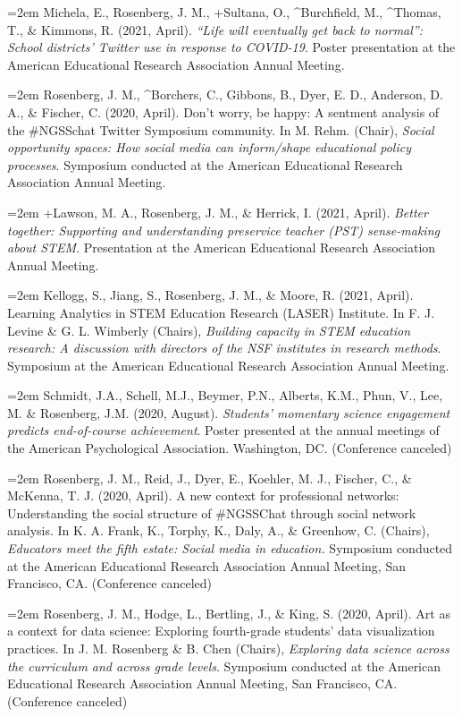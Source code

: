 \documentclass[
  14,
]{article}
\begin{document}
\hangindent=2em Michela, E., Rosenberg, J. M., +Sultana, O.,
\^{}Burchfield, M., \^{}Thomas, T., \& Kimmons, R. (2021, April).
\emph{``Life will eventually get back to normal'': School districts'
Twitter use in response to COVID-19}. Poster presentation at the
American Educational Research Association Annual Meeting.

\hangindent=2em Rosenberg, J. M., \^{}Borchers, C., Gibbons, B., Dyer,
E. D., Anderson, D. A., \& Fischer, C. (2020, April). Don't worry, be
happy: A sentment analysis of the \#NGSSchat Twitter Symposium
community. In M. Rehm. (Chair), \emph{Social opportunity spaces: How
social media can inform/shape educational policy processes}. Symposium
conducted at the American Educational Research Association Annual
Meeting.

\hangindent=2em +Lawson, M. A., Rosenberg, J. M., \& Herrick, I. (2021,
April). \emph{Better together: Supporting and understanding preservice
teacher (PST) sense-making about STEM}. Presentation at the American
Educational Research Association Annual Meeting.

\hangindent=2em Kellogg, S., Jiang, S., Rosenberg, J. M., \& Moore, R.
(2021, April). Learning Analytics in STEM Education Research (LASER)
Institute. In F. J. Levine \& G. L. Wimberly (Chairs), \emph{Building
capacity in STEM education research: A discussion with directors of the
NSF institutes in research methods}. Symposium at the American
Educational Research Association Annual Meeting.

\hangindent=2em Schmidt, J.A., Schell, M.J., Beymer, P.N., Alberts,
K.M., Phun, V., Lee, M. \& Rosenberg, J.M. (2020, August).
\emph{Students' momentary science engagement predicts end-of-course
achievement}. Poster presented at the annual meetings of the American
Psychological Association. Washington, DC. (Conference canceled)

\hangindent=2em Rosenberg, J. M., Reid, J., Dyer, E., Koehler, M. J.,
Fischer, C., \& McKenna, T. J. (2020, April). A new context for
professional networks: Understanding the social structure of \#NGSSChat
through social network analysis. In K. A. Frank, K., Torphy, K., Daly,
A., \& Greenhow, C. (Chairs), \emph{Educators meet the fifth estate:
Social media in education.} Symposium conducted at the American
Educational Research Association Annual Meeting, San Francisco, CA.
(Conference canceled)

\hangindent=2em Rosenberg, J. M., Hodge, L., Bertling, J., \& King, S.
(2020, April). Art as a context for data science: Exploring fourth-grade
students' data visualization practices. In J. M. Rosenberg \& B. Chen
(Chairs), \emph{Exploring data science across the curriculum and across
grade levels}. Symposium conducted at the American Educational Research
Association Annual Meeting, San Francisco, CA. (Conference canceled)
\end{document}
